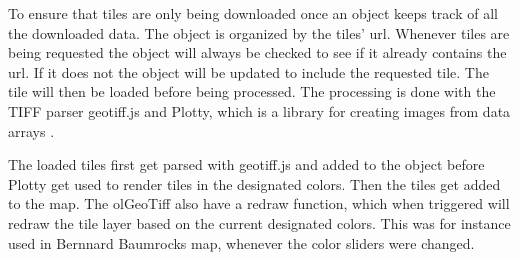 To ensure that tiles are only being downloaded once an object keeps track of all the downloaded data. The object is organized by the tiles’ url. 
Whenever tiles are being requested the object will always be checked to see if it already contains the url. If it does not the object will be updated to include the requested tile. The tile will then be loaded before being processed. \citep{Baumrocks}
The processing is done with the TIFF parser geotiff.js 
\citep{Geotiff}
and Plotty, which is a library for creating images from data arrays \citep{Plotty}.

The loaded tiles first get parsed with geotiff.js and added to the object before Plotty get used to render tiles in the designated colors. Then the tiles get added to the map.
\citep{Baumrocks}
The olGeoTiff also have a redraw function, which when triggered will redraw the tile layer based on the current designated colors. This was for instance used in Bernnard Baumrocks map, whenever the color sliders were changed. 

% 
